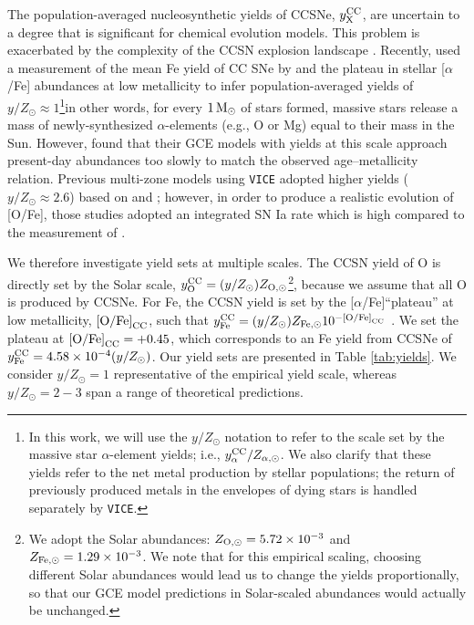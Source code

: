 \documentclass[twocolumn,twocolappendix,linenumbers]{aastex631}
\newcommand{\aFe}{[$\alpha$/Fe]\xspace}
\newcommand{\mathOFe}{{\rm [O/Fe]}}
\newcommand{\yZ}[1]{$y/Z_\odot=#1$}
\newcommand{\Msun}{\,{\rm M}_\odot}
\begin{document}
The population-averaged nucleosynthetic yields of CCSNe, $y_{\rm X}^{\rm CC}$, are uncertain to a degree that is significant for chemical evolution models. This problem is exacerbated by the complexity of the CCSN explosion landscape \citep{sukhbold_core-collapse_2016}. Recently, \citet{weinberg_scale_2024} used a measurement of the mean Fe yield of CC SNe by \citet{rodriguez_iron_2023} and the plateau in stellar \aFe abundances at low metallicity to infer population-averaged yields of $y/Z_\odot\approx1$\footnote{
    In this work, we will use the $y/Z_\odot$ notation to refer to the scale set by the massive star $\alpha$-element yields; i.e., $y_{\alpha}^{\rm CC}/Z_{\alpha,\odot}$. We also clarify that these yields refer to the net metal production by stellar populations; the return of previously produced metals in the envelopes of dying stars is handled separately by {\tt VICE}.
}\textemdash in other words, for every $1\Msun$ of stars formed, massive stars release a mass of newly-synthesized $\alpha$-elements (e.g., O or Mg) equal to their mass in the Sun. However, \citet{johnson_milky_2024} found that their GCE models with yields at this scale approach present-day abundances too slowly to match the observed age--metallicity relation. Previous multi-zone models using {\tt VICE} \citep[e.g.,][]{johnson_stellar_2021,dubay_galactic_2024} adopted higher yields ($y/Z_\odot\approx2.6$) based on \citet{chieffi_explosive_2004} and \citet{limongi_nucleosynthesis_2006}; however, in order to produce a realistic evolution of [O/Fe], those studies adopted an integrated SN Ia rate which is high compared to the measurement of \citet{maoz_star_2017}.

We therefore investigate yield sets at multiple scales. The CCSN yield of O is directly set by the Solar scale, $y_{\rm O}^{\rm CC}=(y/Z_\odot)Z_{\rm O,\odot}$\footnote{
    We adopt the \citet{asplund_chemical_2009} Solar abundances: $Z_{\rm O,\odot}=5.72\times10^{-3}$ and $Z_{\rm Fe,\odot}=1.29\times10^{-3}$. We note that for this empirical scaling, choosing different Solar abundances \citep[e.g.,][]{magg_observational_2022} would lead us to change the yields proportionally, so that our GCE model predictions in Solar-scaled abundances would actually be unchanged.
}, because we assume that all O is produced by CCSNe. For Fe, the CCSN yield is set by the \aFe ``plateau'' at low metallicity, $\mathOFe_{\rm CC}$, such that $y_{\rm Fe}^{\rm CC}=(y/Z_\odot) Z_{\rm Fe,\odot} 10^{-\mathOFe_{\rm CC}}$ \citep[for further discussion on the empirical yield scale and the CCSN plateau, see][]{weinberg_scale_2024}. We set the plateau at $\mathOFe_{\rm CC}=+0.45$, which corresponds to an Fe yield from CCSNe of $y_{\rm Fe}^{\rm CC}=4.58\times10^{-4}(y/Z_\odot)$. Our yield sets are presented in Table \ref{tab:yields}. We consider \yZ{1} representative of the empirical yield scale, whereas \yZ{2-3} span a range of theoretical predictions.
\end{document}
